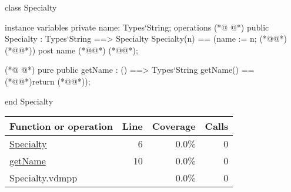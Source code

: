 \begin{vdmpp}[breaklines=true]
class Specialty

instance variables
  private name: Types`String;
operations
(*@
\label{Specialty:6}
@*)
 public Specialty : Types`String ==> Specialty
  Specialty(n) == (name := n; (*@@*) (*@@*))
 post name (*@\vdmnotcovered{=}@*) (*@@*);
  
(*@
\label{getName:10}
@*)
 pure public getName : () ==> Types`String
  getName() == (*@\vdmnotcovered{(}@*)return (*@@*));

end Specialty
\end{vdmpp}
\bigskip
\begin{longtable}{|l|r|r|r|}
\hline
Function or operation & Line & Coverage & Calls \\
\hline
\hline
\hyperref[Specialty:6]{Specialty} & 6&0.0\% & 0 \\
\hline
\hyperref[getName:10]{getName} & 10&0.0\% & 0 \\
\hline
\hline
Specialty.vdmpp & & 0.0\% & 0 \\
\hline
\end{longtable}

